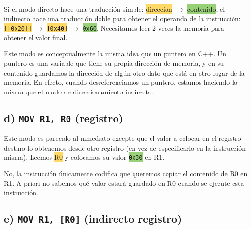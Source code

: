 

Si el modo directo hace una traducción simple: \colorbox[HTML]{FFD966}{dirección} $\to$ \colorbox[HTML]{97D077}{contenido}, el indirecto hace una traducción doble para obtener el operando de la instrucción: \colorbox[HTML]{FFD966}{\lstinline{[[0x20]]}} $\to$ \colorbox[HTML]{FFD966}{\lstinline{[0x40]}} $\to$ \colorbox[HTML]{97D077}{\lstinline{0x60}}. Necesitamos leer 2 veces la memoria para obtener el valor final.


Este modo es conceptualmente la misma idea que un puntero en C++. Un puntero es una variable que tiene su propia dirección de memoria, y en su contenido guardamos la dirección de algún otro dato que está en otro lugar de la memoria. En efecto, cuando desreferenciamos un puntero, estamos haciendo lo mismo que el modo de direccionamiento indirecto.


\subsection*{d) \lstinline{MOV R1, R0} (registro)}

\setlength{\columnsep}{10em}
\begin{multicols}{2}


\columnbreak

Este modo es parecido al inmediato excepto que el valor a colocar en el registro destino lo obtenemos desde otro registro (en vez de especificarlo en la instrucción misma). Leemos \colorbox[HTML]{FFD966}{R0} y colocamos su valor \colorbox[HTML]{97D077}{\lstinline{0x30}} en R1.


No, la instrucción únicamente codifica que queremos copiar el contenido de R0 en R1. A priori no sabemos qué valor estará guardado en R0 cuando se ejecute esta instrucción.
\end{multicols}

\subsection*{e) \lstinline{MOV R1, [R0]} (indirecto registro)}

